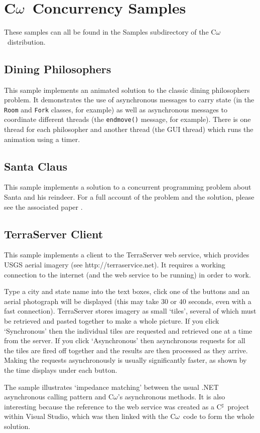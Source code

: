 \documentclass{article}
\newcommand{\comega}{\mbox{C$\omega$}}
\newcommand{\csharp}{\mbox{C$^\sharp$}}
\begin{document}
\section{\comega\ Concurrency Samples}
These samples can all be found in the Samples subdirectory of the
\comega\ distribution.
\subsection{Dining Philosophers}
This sample implements an animated solution to the classic dining
philosophers problem. It demonstrates the use of asynchronous messages
to carry state (in the \texttt{Room} and \texttt{Fork} classes, for
example) as well as asynchronous messages to coordinate different
threads (the \texttt{endmove()} message, for example). There is one
thread for each philosopher and another thread (the GUI thread) which
runs the animation using a timer.

\subsection{Santa Claus}
This sample implements a solution to a concurrent programming problem
about Santa and his reindeer. For a full account of the problem and
the solution, please see the associated paper \cite{benton:santa}.

\subsection{TerraServer Client}
This sample implements a client to the TerraServer web service, which
provides USGS aerial imagery (see http://terraservice.net). It
requires a working connection to the internet (and the web service to
be running) in order to work.

Type a city and state name into the text boxes, click one of the
buttons and an aerial photograph will be displayed (this may take 30
or 40 seconds, even with a fast connection). TerraServer stores
imagery as small `tiles', several of which must be retrieved and
pasted together to make a whole picture. If you click `Synchronous'
then the individual tiles are requested and retrieved one at a time
from the server. If you click `Asynchronous' then asynchronous
requests for all the tiles are fired off together and the results are
then processed as they arrive. Making the requests asynchronously is
usually significantly faster, as shown by the time displays under each
button.

The sample illustrates `impedance matching' between the usual .NET
asynchronous calling pattern and {\comega}'s asynchronous methods. It
is also interesting because the reference to the web service was
created as a \csharp\ project within Visual Studio, which was then
linked with the \comega\ code to form the whole solution.
\end{document}
